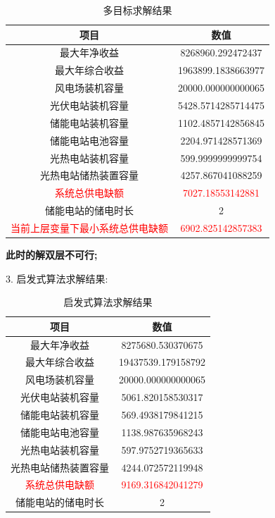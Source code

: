 \documentclass{article}
\begin{document}
\begin{table}[H]
    \centering
    \caption{多目标求解结果}
    \label{tab:multi_objective_result}
    \begin{tabular}{c|c}
        \toprule
        \textbf{项目} & \textbf{数值} \\
        \midrule
        最大年净收益 & 8268960.292472437 \\
        最大年综合收益 & 1963899.1838663977 \\
        风电场装机容量 & 20000.000000000065 \\
        光伏电站装机容量 & 5428.5714285714475 \\
        储能电站装机容量 & 1102.4857142856845 \\
        储能电站电池容量 & 2204.971428571369 \\
        光热电站装机容量 & 599.9999999999754 \\
        光热电站储热装置容量 & 4257.867041088259 \\
        \textcolor{red}{系统总供电缺额} & \textcolor{red}{7027.18553142881} \\
        储能电站的储电时长 & 2 \\
        \textcolor{red}{当前上层变量下最小系统总供电缺额} & \textcolor{red}{6902.825142857383} \\
        \bottomrule
    \end{tabular}
\end{table}

\bf{此时的解双层不可行};

3. 启发式算法求解结果:
\begin{table}[H]
    \centering
    \caption{启发式算法求解结果}
    \label{tab:heuristic_result}
    \begin{tabular}{c|c}
        \toprule
        \textbf{项目} & \textbf{数值} \\
        \midrule
        最大年净收益 & 8275680.530370675 \\
        最大年综合收益 & 19437539.179158792 \\
        风电场装机容量 & 20000.000000000065 \\
        光伏电站装机容量 & 5061.820158530317 \\
        储能电站装机容量 & 569.4938179841215 \\
        储能电站电池容量 & 1138.987635968243 \\
        光热电站装机容量 & 597.9752719365633 \\
        光热电站储热装置容量 & 4244.072572119948 \\
        \textcolor{red}{系统总供电缺额} & \textcolor{red}{9169.316842041279} \\
        储能电站的储电时长 & 2 \\
        \bottomrule
    \end{tabular}
\end{table}
\end{document}
